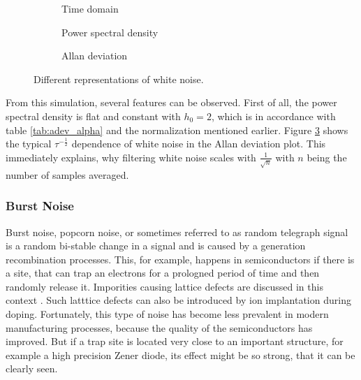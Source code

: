 \begin{figure}[ht]
    \centering
    \begin{subfigure}{0.32\linewidth}
        \scalebox{0.75}{%
            
        } %
        \caption{Time domain}
        \label{fig:white_noise_time}
    \end{subfigure}
    \hfill
    \begin{subfigure}{0.32\linewidth}
        \scalebox{0.75}{%
            
        } %
        \caption{Power spectral density}
        \label{fig:white_noise_psd}
    \end{subfigure}
    \hfill
    \begin{subfigure}{0.32\linewidth}
        \scalebox{0.75}{%
            
        } %
        \caption{Allan deviation}
        \label{fig:white_noise_adev}
    \end{subfigure}
    \caption{Different representations of white noise.}
    \label{fig:white_noise_simulated}
\end{figure}

From this simulation, several features can be observed. First of all, the power spectral density is flat and constant with $h_0 = 2$, which is in accordance with table \ref{tab:adev_alpha} and the normalization mentioned earlier. Figure \ref{fig:white_noise_adev} shows the typical $\tau^{-\frac 1 2}$ dependence of white noise in the Allan deviation plot. This immediately explains, why filtering white noise scales with $\frac{1}{\sqrt{n}}$ with $n$ being the number of samples averaged.

\clearpage
\subsubsection{Burst Noise}
Burst noise, popcorn noise, or sometimes referred to as random telegraph signal is a random bi-stable change in a signal and is caused by a generation recombination processes. This, for example, happens in semiconductors if there is a site, that can trap an electrons for a prologned period of time and then randomly release it. Imporities causing lattice defects are discussed in this context \cite{kay2012operational,burst_noise_psd,popcorn_noise_orgin,technote_ti_popcorn_noise}. Such latttice defects can also be introduced by ion implantation during doping. Fortunately, this type of noise has become less prevalent in modern manufacturing processes, because the quality of the semiconductors has improved. But if a trap site is located very close to an important structure, for example a high precision Zener diode, its effect might be so strong, that it can be clearly seen.

